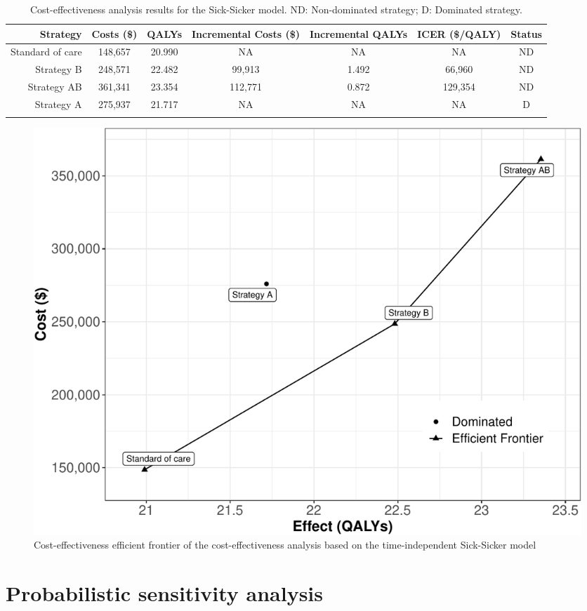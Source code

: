 \documentclass[
]{article}
\begin{document}
\begin{table}[!h]

\caption{\label{tab:table-cea}Cost-effectiveness analysis results for the Sick-Sicker model. ND: Non-dominated strategy; D: Dominated strategy.}
\centering
\begin{tabular}[t]{rcccccc}
\toprule{}
Strategy & Costs (\$) & QALYs & Incremental Costs (\$) & Incremental QALYs & ICER (\$/QALY) & Status\\
\midrule{}
Standard of care & 148,657 & 20.990 & NA & NA & NA & ND\\
Strategy B & 248,571 & 22.482 & 99,913 & 1.492 & 66,960 & ND\\
Strategy AB & 361,341 & 23.354 & 112,771 & 0.872 & 129,354 & ND\\
Strategy A & 275,937 & 21.717 & NA & NA & NA & D\\
\bottomrule{}
\end{tabular}
\end{table}

\begin{figure}[H]

{\centering \includegraphics{figs/Sick-Sicker-CEA-1} 

}

\caption{Cost-effectiveness efficient frontier of the cost-effectiveness analysis based on the time-independent Sick-Sicker model}\label{fig:Sick-Sicker-CEA}
\end{figure}

\hypertarget{probabilistic-sensitivity-analysis}{%
\section{Probabilistic sensitivity analysis}\label{probabilistic-sensitivity-analysis}}
\end{document}
